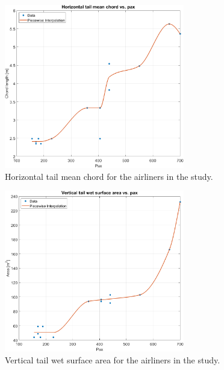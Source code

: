 \documentclass[english]{kththesis}
\begin{document}
\begin{figure}[!ht]
    \centering
    \includegraphics[width=0.7\textwidth]{Epictures/HTailChordVSPax.png}
    \caption{Horizontal tail mean chord for the airliners in the study.}
    \label{fig:HtailChordPax}
\end{figure}

\begin{figure}[!ht]
    \centering
    \includegraphics[width=0.7\textwidth]{Epictures/VTailWetVSPax.png}
    \caption{Vertical tail wet surface area for the airliners in the study.}
    \label{fig:VtailWetPax}
\end{figure}
\end{document}
